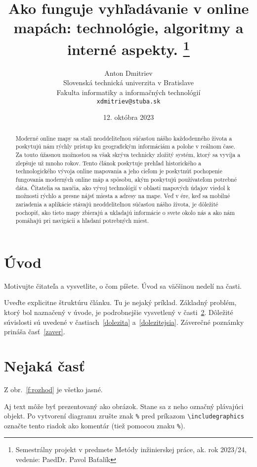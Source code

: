 \documentclass[10pt,oneside,slovak,a4paper]{article}
\title{Ako funguje vyhľadávanie v online mapách: technológie, algoritmy a interné aspekty.
\thanks{Semestrálny projekt v predmete Metódy inžinierskej práce, ak. rok 2023/24, vedenie: PaedDr. Pavol Baťalík}} %
\author{Anton Dmitriev\\[2pt]
	{\small Slovenská technická univerzita v Bratislave}\\
	{\small Fakulta informatiky a informačných technológií}\\
	{\small \texttt{xdmitriev@stuba.sk}}
	}
\date{\small 12. októbra 2023} %
\begin{document}
\maketitle

\begin{abstract}
	Moderné online mapy sa stali neoddeliteľnou súčasťou nášho každodenného života
	 a poskytujú nám rýchly prístup ku geografickým informáciám a polohe v reálnom čase. 
	 Za touto úžasnou možnosťou sa však skrýva technicky zložitý systém, ktorý sa vyvíja 
	 a zlepšuje už mnoho rokov. Tento článok poskytuje prehľad historického a technologického 
	 vývoja online mapovania a jeho cieľom je poskytnúť pochopenie fungovania moderných 
	 online máp a spôsobu, akým poskytujú používateľom potrebné dáta. Čitatelia sa naučia, ako 
	 vývoj technológií v oblasti mapových údajov viedol k možnosti rýchlo a presne nájsť 
	 miesta a adresy na mape. Veď v ére, keď sa mobilné zariadenia a aplikácie stávajú 
	 neoddeliteľnou súčasťou nášho života, je dôležité pochopiť, ako tieto mapy zbierajú a 
	 ukladajú informácie o svete okolo nás a ako nám pomáhajú pri navigácii a hľadaní 
	 potrebných miest.
\end{abstract}



\section{Úvod}

Motivujte čitateľa a vysvetlite, o čom píšete. Úvod sa väčšinou nedelí na časti.

Uveďte explicitne štruktúru článku. Tu je nejaký príklad.
Základný problém, ktorý bol naznačený v úvode, je podrobnejšie vysvetlený v časti~\ref{nejaka}.
Dôležité súvislosti sú uvedené v častiach~\ref{dolezita} a~\ref{dolezitejsia}.
Záverečné poznámky prináša časť~\ref{zaver}.



\section{Nejaká časť} \label{nejaka}

Z obr.~\ref{f:rozhod} je všetko jasné. 

\begin{figure*}[tbh]
\centering
Aj text môže byť prezentovaný ako obrázok. Stane sa z neho označný plávajúci objekt. Po vytvorení diagramu zrušte znak \texttt{\%} pred príkazom \verb|\includegraphics| označte tento riadok ako komentár (tiež pomocou znaku \texttt{\%}).
\caption{Rozhodujúci argument.}
\label{f:rozhod}
\end{figure*}
\end{document}
